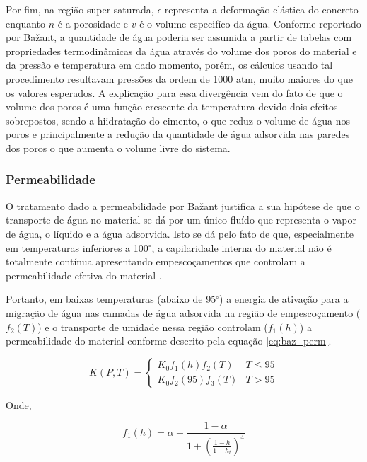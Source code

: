Por fim, na região super saturada, $\epsilon$ representa a deformação elástica
do concreto enquanto $n$ é a porosidade e $v$ é o volume especifíco da água.
Conforme reportado por Ba\v{z}ant, a quantidade de água poderia ser assumida a
partir de tabelas com propriedades termodinâmicas da água através do volume dos
poros do material e da pressão e temperatura em dado momento, porém, os cálculos
usando tal procedimento resultavam pressões da ordem de 1000 atm, muito maiores
do que os valores esperados. A explicação para essa divergência vem do fato de
que o volume dos poros é uma função crescente da temperatura devido dois efeitos
sobrepostos, sendo a hiidratação do cimento, o que reduz o volume de água nos
poros e principalmente a redução da quantidade de água adsorvida nas paredes dos
poros o que aumenta o volume livre do sistema.

\subsubsection{Permeabilidade}
O tratamento dado a permeabilidade por Ba\v{z}ant justifica a sua hipótese de
que o transporte de água no material se dá por um único fluído que representa o
vapor de água, o líquido e a água adsorvida. Isto se dá pelo fato de que,
especialmente em temperaturas inferiores a 100$^{\circ}$, a capilaridade interna
do material não é totalmente contínua apresentando empescoçamentos que controlam
a permeabilidade efetiva do material \cite{bazant1978}.

Portanto, em baixas temperaturas (abaixo de 95$^{\circ}$) a energia de ativação
para a migração de água nas camadas de água adsorvida na região de
empescoçamento ($f_2(T)$) e o transporte de umidade nessa região controlam
($f_1(h)$) a permeabilidade do material conforme descrito pela equação
\ref{eq:baz_perm}.
    
\begin{equation}
  \label{eq:baz_perm}
  K(P, T) =
  \begin{cases} 
    K_0 f_1(h) f_2(T) & T \leq 95 \\
    K_0 f_2(95) f_3(T) & T > 95
  \end{cases}
\end{equation}

Onde,

\begin{equation}
  \label{eq:f1}
  f_1(h) = \alpha + \frac{1-\alpha}{1+\left(\frac{1-h}{1-h_t}\right)^4} 
\end{equation}

